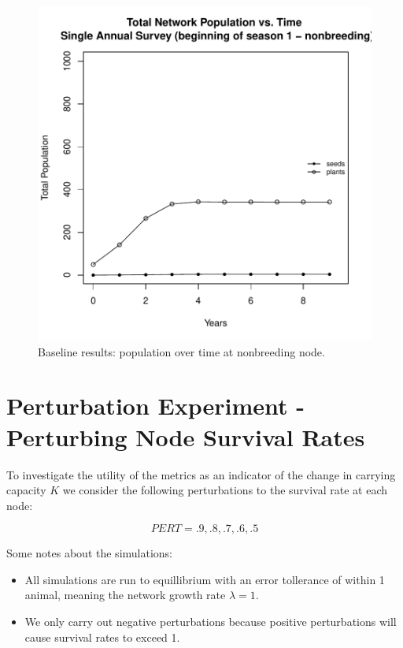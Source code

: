 \documentclass[10pt]{article}
\begin{document}
\begin{figure}[H]
\begin{center}
\includegraphics[width=.7\textwidth, height=.6\textwidth]{RGraphics-plantbaseline}
\caption{Baseline results: population over time at nonbreeding node.}\label{fig:plantbaseline}
\end{center}
\end{figure}

\clearpage


\section{Perturbation Experiment - Perturbing Node Survival Rates}

To investigate the utility of the metrics as an indicator of the change in carrying capacity $K$ we consider the following perturbations to the survival rate at each node:

\[PERT = .9, .8, .7, .6, .5\]

Some notes about the simulations:
\begin{itemize}
\item All simulations are run to equillibrium with an error tollerance of within 1 animal, meaning the network growth rate $\lambda=1$.
\item We only carry out negative perturbations because positive perturbations will cause survival rates to exceed 1.
\end{itemize}
%  


\newpage 
\end{document}
